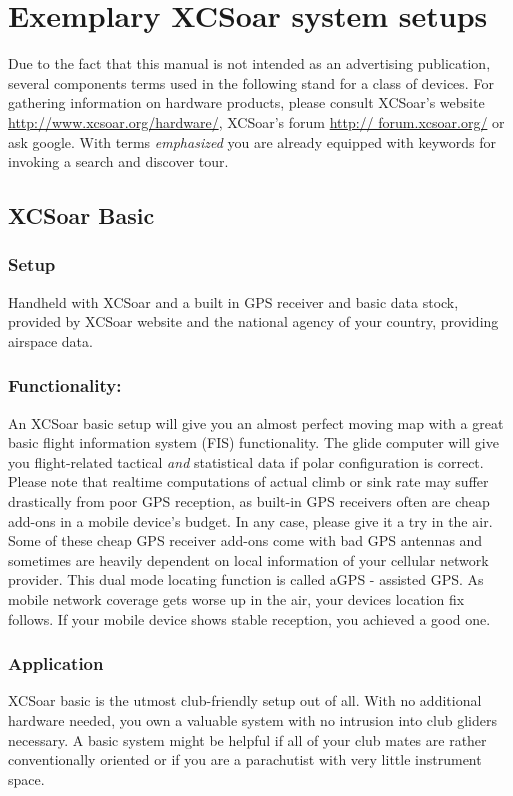 \section{Exemplary XCSoar system setups}
Due to the fact that this manual is not intended as an advertising publication,
several components terms used in the following stand for a class of devices. For
gathering information on hardware products, please consult XCSoar's website 
\url{http://www.xcsoar.org/hardware/}, XCSoar's forum \url{http://
forum.xcsoar.org/} or ask google. With terms \emph{emphasized} you are already 
equipped with keywords for invoking a search and discover tour.

\subsection*{XCSoar Basic}
\subsubsection*{Setup} Handheld with XCSoar and a built in GPS receiver and basic 
data stock, provided by XCSoar website and the national agency of your country, 
providing airspace data.

\subsubsection*{Functionality:} An XCSoar basic setup will give you an almost 
perfect moving map with a great basic flight information system (FIS) 
functionality. The glide computer will give you flight-related tactical 
\emph{and} statistical data if polar configuration is correct. Please note that
realtime computations of actual climb or sink rate may suffer drastically from
poor GPS reception, as built-in GPS receivers often are cheap add-ons in a mobile
device's budget. In any case, please give it a try in the air.  Some of these 
cheap GPS receiver add-ons come with bad GPS antennas and sometimes are heavily 
dependent on local information of your cellular network provider. This dual mode 
locating function is called aGPS - assisted GPS. As mobile network coverage gets 
worse up in the air, your devices location fix follows. If your mobile device 
shows stable reception, you achieved a good one.

\subsubsection*{Application} XCSoar basic is the utmost club-friendly setup out 
of all.  With no additional hardware needed, you own a valuable system with no 
intrusion into club gliders necessary. A basic system might be helpful if all of 
your club mates are rather conventionally oriented or if you are a parachutist 
with very little instrument space.

